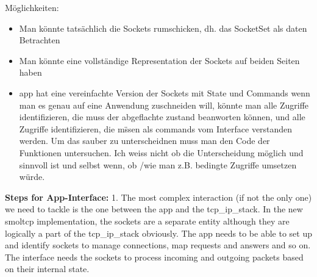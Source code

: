 M\"oglichkeiten:
\begin{itemize}
    \item Man k\"onnte tats\"achlich die Sockets rumschicken, dh. das SocketSet als daten Betrachten 
    \item Man k\"onnte eine vollst\"andige Representation der Sockets auf beiden Seiten haben
    \item app hat eine vereinfachte Version der Sockets mit State und Commands \means wenn man es genau auf eine Anwendung zuschneiden will, k\"onnte man alle  Zugriffe identifizieren, die muss der abgeflachte zustand beanworten k\"onnen, und alle  Zugriffe identifizieren, die m\"ssen als commands vom Interface verstanden werden. \means Um das sauber zu unterscheidnen muss man den Code der Funktionen untersuchen. Ich weiss nicht ob die Unterscheidung m\"oglich und sinnvoll ist und selbst wenn, ob /wie man z.B. bedingte Zugriffe  umsetzen würde. 
\end{itemize}


\textbf{Steps for App-Interface:}
1. The most complex interaction (if not the only one) we need to tackle is the one between the app and the tcp\_ip\_stack. In the new smoltcp implementation, the sockets are a separate entity although they are logically a part of the tcp\_ip\_stack obviously. The app needs to be able to set up and identify sockets to manage connections, map requests and answers and so on. The interface needs the sockets to process incoming and outgoing packets based on their internal state.   




